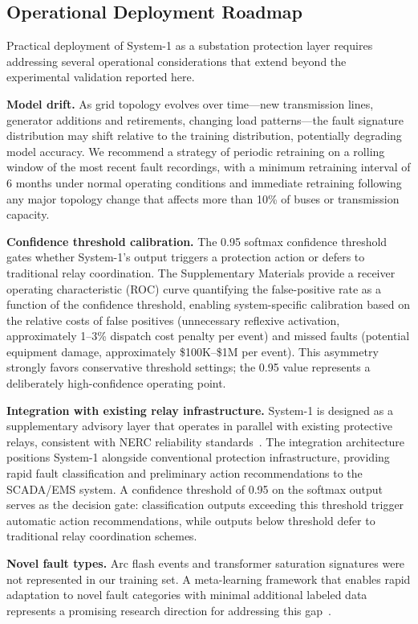 \documentclass[journal]{IEEEtran}
\begin{document}
\subsection{Operational Deployment Roadmap}

Practical deployment of System-1 as a substation protection layer requires addressing several operational considerations that extend beyond the experimental validation reported here.

\textbf{Model drift.} As grid topology evolves over time---new transmission lines, generator additions and retirements, changing load patterns---the fault signature distribution may shift relative to the training distribution, potentially degrading model accuracy. We recommend a strategy of periodic retraining on a rolling window of the most recent fault recordings, with a minimum retraining interval of 6 months under normal operating conditions and immediate retraining following any major topology change that affects more than 10\% of buses or transmission capacity.

\textbf{Confidence threshold calibration.} The 0.95 softmax confidence threshold gates whether System-1's output triggers a protection action or defers to traditional relay coordination. The Supplementary Materials provide a receiver operating characteristic (ROC) curve quantifying the false-positive rate as a function of the confidence threshold, enabling system-specific calibration based on the relative costs of false positives (unnecessary reflexive activation, approximately 1--3\% dispatch cost penalty per event) and missed faults (potential equipment damage, approximately \$100K--\$1M per event). This asymmetry strongly favors conservative threshold settings; the 0.95 value represents a deliberately high-confidence operating point.

\textbf{Integration with existing relay infrastructure.} System-1 is designed as a supplementary advisory layer that operates in parallel with existing protective relays, consistent with NERC reliability standards~\cite{ref37}. The integration architecture positions System-1 alongside conventional protection infrastructure, providing rapid fault classification and preliminary action recommendations to the SCADA/EMS system. A confidence threshold of 0.95 on the softmax output serves as the decision gate: classification outputs exceeding this threshold trigger automatic action recommendations, while outputs below threshold defer to traditional relay coordination schemes.

\textbf{Novel fault types.} Arc flash events and transformer saturation signatures were not represented in our training set. A meta-learning framework that enables rapid adaptation to novel fault categories with minimal additional labeled data represents a promising research direction for addressing this gap~\cite{ref_meta}.
\end{document}
